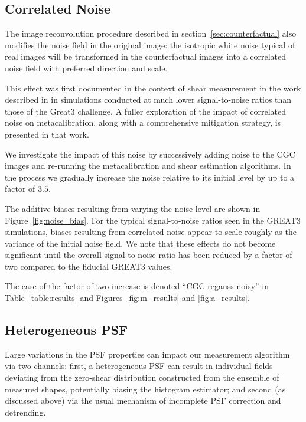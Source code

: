 \documentclass[iop]{emulateapj}
\begin{document}
\subsection{Correlated Noise}
The image reconvolution procedure described in
section~\ref{sec:counterfactual} also modifies the noise field in the
original image: the isotropic white noise typical of real images will
be transformed in the counterfactual images into a correlated noise
field with preferred direction and scale. 

This effect was first documented in the context of shear measurement
in the work described in \citet{metacalII} in simulations
conducted at much lower signal-to-noise ratios than those of the
Great3 challenge. A fuller exploration of the impact of correlated
noise on metacalibration, along with a comprehensive mitigation
strategy, is presented in that work.

We investigate the impact of this noise by successively adding noise
to the CGC images and re-running the metacalibration and shear
estimation algorithms. In the process we gradually increase the noise
relative to its initial level by up to a factor of $3.5$.

The additive biases resulting from varying the noise level are
shown in Figure~\ref{fig:noise_bias}. For the typical signal-to-noise ratios seen
in the GREAT3 simulations, biases resulting from correlated noise
appear to scale roughly as the variance of the initial noise field. We
note that these effects do not become significant until the overall
signal-to-noise ratio has been reduced by a factor of two compared to the fiducial
GREAT3 values.

The case of the factor of two increase is denoted ``CGC-regauss-noisy'' in
Table~\ref{table:results} and Figures~\ref{fig:m_results} and
\ref{fig:a_results}.

\subsection{Heterogeneous PSF}
Large variations in the PSF properties can impact our measurement
algorithm via two channels: first, a heterogeneous PSF can result in
individual fields deviating from the zero-shear distribution
constructed from the ensemble of measured shapes, potentially biasing
the histogram estimator; and second (as discussed above) via the usual
mechanism of incomplete PSF correction and detrending.
\end{document}
